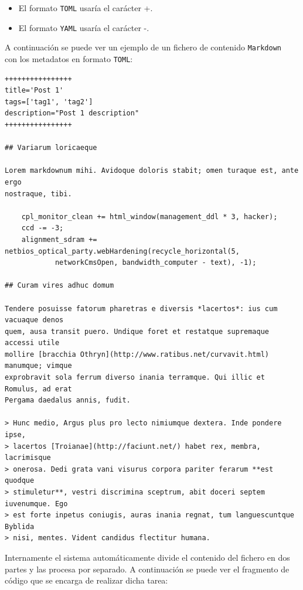 \documentclass[a4paper,12pt]{article}
\begin{document}
\begin{itemize}
    \item El formato \texttt{TOML} usaría el carácter +.
    \item El formato \texttt{YAML} usaría el carácter -.
\end{itemize}

A continuación se puede ver un ejemplo de un fichero de contenido \texttt{Markdown}~\cite{markdown} con los metadatos en formato
\texttt{TOML}:

\begin{verbatim}
++++++++++++++++
title='Post 1'
tags=['tag1', 'tag2']
description="Post 1 description"
++++++++++++++++

## Variarum loricaeque

Lorem markdownum mihi. Avidoque doloris stabit; omen turaque est, ante ergo
nostraque, tibi.

    cpl_monitor_clean += html_window(management_ddl * 3, hacker);
    ccd -= -3;
    alignment_sdram += netbios_optical_party.webHardening(recycle_horizontal(5,
            networkCmsOpen, bandwidth_computer - text), -1);

## Curam vires adhuc domum

Tendere posuisse fatorum pharetras e diversis *lacertos*: ius cum vacuaque denos
quem, ausa transit puero. Undique foret et restatque supremaque accessi utile
mollire [bracchia Othryn](http://www.ratibus.net/curvavit.html) manumque; vimque
exprobravit sola ferrum diverso inania terramque. Qui illic et Romulus, ad erat
Pergama daedalus annis, fudit.

> Hunc medio, Argus plus pro lecto nimiumque dextera. Inde pondere ipse,
> lacertos [Troianae](http://faciunt.net/) habet rex, membra, lacrimisque
> onerosa. Dedi grata vani visurus corpora pariter ferarum **est quodque
> stimuletur**, vestri discrimina sceptrum, abit doceri septem iuvenumque. Ego
> est forte inpetus coniugis, auras inania regnat, tum languescuntque Byblida
> nisi, mentes. Vident candidus flectitur humana.
\end{verbatim}

Internamente el sistema automáticamente divide el contenido del fichero en dos partes y las procesa por separado.
A continuación se puede ver el fragmento de código que se encarga de realizar dicha tarea:
\end{document}
